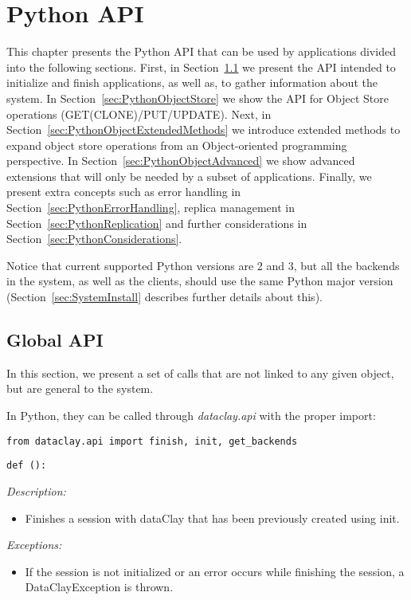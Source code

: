 
\chapter{Python API}
\label{sec:PythonAPI}

This chapter presents the Python API that can be used by applications divided into the following sections. First, in Section~\ref{sec:PythonGlobalAPI} we present the API intended to initialize and finish applications, as well as, to gather information about the system. In Section~\ref{sec:PythonObjectStore} we show the API for Object Store operations (GET(CLONE)/PUT/UPDATE). Next, in Section~\ref{sec:PythonObjectExtendedMethods} we introduce extended methods to expand object store operations from an Object-oriented programming perspective. In Section~\ref{sec:PythonObjectAdvanced} we show advanced extensions that will only be needed by a subset of applications. Finally, we present extra concepts such as error handling in Section~\ref{sec:PythonErrorHandling}, replica management in Section~\ref{sec:PythonReplication} and further considerations in Section~\ref{sec:PythonConsiderations}.

Notice that current supported Python versions are 2 and 3, but all the backends in the system, as well as the clients, should use the same Python major version (Section~\ref{sec:SystemInstall} describes further details about this).

\section{Global API}
\label{sec:PythonGlobalAPI}

In this section, we present a set of calls that are not linked to any given object, but are general to the system.

In Python, they can be called through \textit{dataclay.api} with the proper import:

\colorbox{basecolor!15}{\texttt{from dataclay.api import finish, init, get\_backends}}



\begin{dBox}
\texttt{def ():}
\LINE

{\it Description:}

\begin{itemize}
    \item Finishes a session with dataClay that has been previously created using init.
\end{itemize}

{\it Exceptions:}

\begin{itemize}
    \item If the session is not initialized or an error occurs while finishing the session, a DataClayException is thrown.
\end{itemize}
 
\end{dBox}


